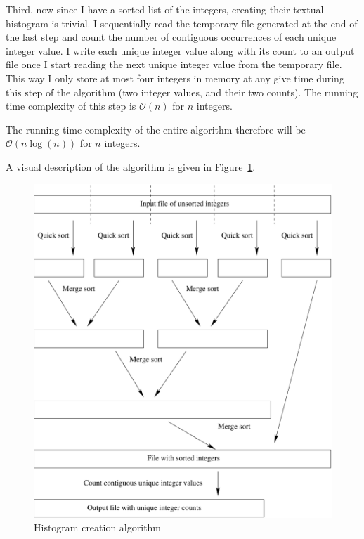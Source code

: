 \documentclass{article}
\begin{document}
Third, now since I have a sorted list of the integers, creating their textual histogram is trivial.  I sequentially read the temporary file generated at the end of the last step and count the number of contiguous occurrences of each unique integer value.  I write each unique integer value along with its count to an output file once I start reading the next unique integer value from the temporary file.  This way I only store at most four integers in memory at any give time during this step of the algorithm (two integer values, and their two counts).  The running time complexity of this step is $\mathcal{O}(n)$ for $n$ integers.

The running time complexity of the entire algorithm therefore will be $\mathcal{O}(n\log(n))$ for $n$ integers.

A visual description of the algorithm is given in Figure~\ref{fig:count_alg}.

\begin{figure}
  \label{fig:count_alg}
  \centering
  \includegraphics[width=0.9\linewidth]{count_alg.pdf}
  \caption{Histogram creation algorithm}
\end{figure}
\end{document}
